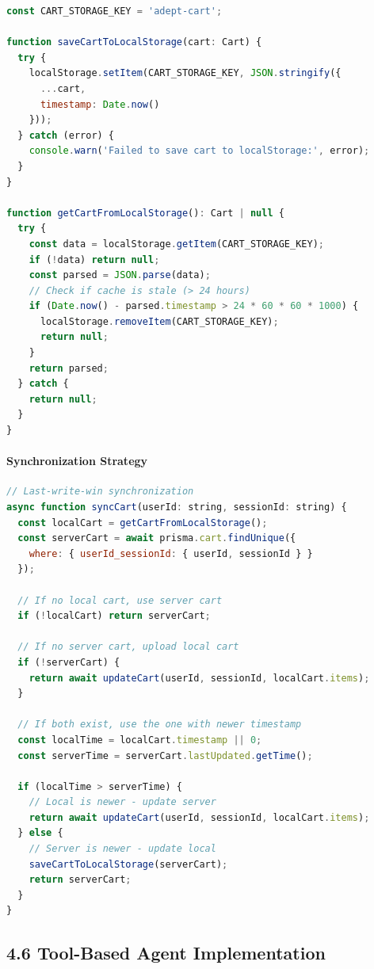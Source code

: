 \documentclass[12pt,a4paper]{article}
\begin{document}
\begin{lstlisting}[language=JavaScript, caption=Client-Side Cart Storage]
const CART_STORAGE_KEY = 'adept-cart';

function saveCartToLocalStorage(cart: Cart) {
  try {
    localStorage.setItem(CART_STORAGE_KEY, JSON.stringify({
      ...cart,
      timestamp: Date.now()
    }));
  } catch (error) {
    console.warn('Failed to save cart to localStorage:', error);
  }
}

function getCartFromLocalStorage(): Cart | null {
  try {
    const data = localStorage.getItem(CART_STORAGE_KEY);
    if (!data) return null;
    const parsed = JSON.parse(data);
    // Check if cache is stale (> 24 hours)
    if (Date.now() - parsed.timestamp > 24 * 60 * 60 * 1000) {
      localStorage.removeItem(CART_STORAGE_KEY);
      return null;
    }
    return parsed;
  } catch {
    return null;
  }
}
\end{lstlisting}

\paragraph{Synchronization Strategy}

\begin{lstlisting}[language=JavaScript, caption=Last-Write-Win Synchronization]
// Last-write-win synchronization
async function syncCart(userId: string, sessionId: string) {
  const localCart = getCartFromLocalStorage();
  const serverCart = await prisma.cart.findUnique({
    where: { userId_sessionId: { userId, sessionId } }
  });
  
  // If no local cart, use server cart
  if (!localCart) return serverCart;
  
  // If no server cart, upload local cart
  if (!serverCart) {
    return await updateCart(userId, sessionId, localCart.items);
  }
  
  // If both exist, use the one with newer timestamp
  const localTime = localCart.timestamp || 0;
  const serverTime = serverCart.lastUpdated.getTime();
  
  if (localTime > serverTime) {
    // Local is newer - update server
    return await updateCart(userId, sessionId, localCart.items);
  } else {
    // Server is newer - update local
    saveCartToLocalStorage(serverCart);
    return serverCart;
  }
}
\end{lstlisting}

\subsection{4.6 Tool-Based Agent Implementation}
\end{document}
